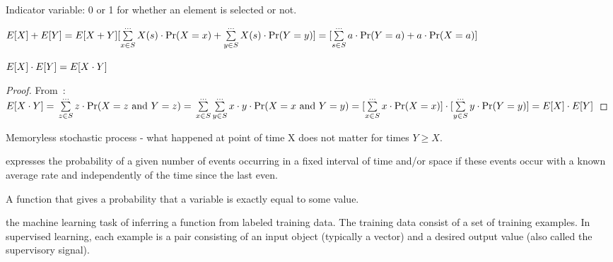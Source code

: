 \begin{definition}
    Indicator variable: 0 or 1 for whether an element is selected or not.
\end{definition}


\begin{definition}\label{lin_expect}
    $ E[X] + E[Y] = E[X + Y] \newline
    [\sum\limits_{x \in S}^{\dots} X(s) \cdot \Pr(X = x) +
    \sum\limits_{y \in S}^{\dots} X(s) \cdot \Pr(Y = y) ] \newline
    = [\sum\limits_{s \in S}^{\dots} a \cdot \Pr(Y = a) + a \cdot \Pr(X = a) ]
    $
\end{definition}

\begin{theorem}
    $ \newline E[X] \cdot E[Y] = E[X \cdot Y]$
\end{theorem}
\begin{proof}
    From~: \newline
    $
    E[X \cdot Y] = \newline \sum\limits_{z \in S}^{\dots} z \cdot 
        \Pr(X = z \text{ and } Y = z) = \newline
    \sum\limits_{x \in S}^{\dots}\sum\limits_{y \in S}^{\dots} x \cdot y
    \cdot \Pr(X = x \text{ and } Y=y) = \newline
    [\sum\limits_{x \in S}^{\dots} x \cdot \Pr(X = x)] \cdot  
    [\sum\limits_{y \in S}^{\dots} y \cdot \Pr(Y = y)]  = \newline
    E[X] \cdot E[Y]
    $
\end{proof}


\begin{definition}
    Memoryless stochastic process - what happened at point of time X
    does not matter for times $Y \geq X$.
\end{definition}

\begin{definition}
    expresses the probability of a given number of events occurring in a fixed
    interval of time and/or space if these events occur with a known average
    rate and independently of the time since the last even.

\end{definition}

\begin{definition}
    A function that gives a probability that a variable is exactly equal to
    some value.
\end{definition}

\begin{definition}
    the machine learning task of inferring a function from labeled training
    data. The training data consist of a set of training examples. In
    supervised learning, each example is a pair consisting of an input object
    (typically a vector) and a desired output value (also called the
    supervisory signal).

\end{definition}
